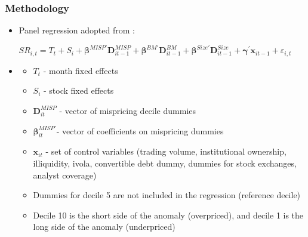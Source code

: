 \documentclass{beamer}
\begin{document}
%	
\begin{frame}
	\frametitle{Methodology}
	\begin{itemize}
		\item Panel regression adopted from \citet{Hanson2014}:
	\end{itemize}
		\begin{equation} \nonumber 
			SR_{i,t} = T_t + S_i+\bm{\beta}^{MISP\prime}  \bm{D}^{MISP}_{it-1} +\bm{\beta}^{BM\prime} \bm{D}^{BM}_{it-1}+\bm{\beta}^{Size\prime}  \bm{D}^{Size}_{it-1}  +\bm{\gamma}^\prime \bm{x}_{it-1} + \varepsilon_{i,t}
		\end{equation}

\begin{itemize}
\item[]
\begin{itemize}
	\item $T_t$ - month fixed effects
	\item $S_i$ - stock fixed effects
	\item $\bm{D}^{MISP}_{it}$ - vector of mispricing decile dummies
	\item $\bm{\beta}^{MISP\prime}_{it}$- vector of coefficients on mispricing dummies
	\item $\bm{x}_{it}$ - set of control variables (trading volume, institutional ownership, illiquidity, ivola, convertible debt dummy, dummies for stock exchanges, analyst coverage)
	\item Dummies for decile 5 are not included in the regression (reference decile)
	\item Decile 10 is the short side of the anomaly (overpriced), and decile 1  is the long side of the anomaly (underpriced)

\end{itemize}
\end{itemize}
\end{frame}  
\end{document}
